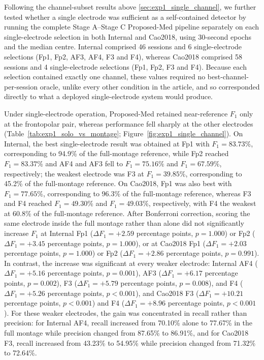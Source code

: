 Following the channel-subset results above \ref{sec:exp1_single_channel}, we further tested whether a single electrode was sufficient as a self-contained detector by running the complete Stage A--Stage C Proposed-Med pipeline separately on each single-electrode selection in both Internal and Cao2018, using 30-second epochs and the median centre. Internal comprised 46 sessions and 6 single-electrode selections (Fp1, Fp2, AF3, AF4, F3 and F4), whereas Cao2018 comprised 58 sessions and 4 single-electrode selections (Fp1, Fp2, F3 and F4). Because each selection contained exactly one channel, these values required no best-channel-per-session oracle, unlike every other condition in the article, and so corresponded directly to what a deployed single-electrode system would produce.

Under single-electrode operation, Proposed-Med retained near-reference $F_1$ only at the frontopolar pair, whereas performance fell sharply at the other electrodes (Table~\ref{tab:exp1_solo_vs_montage}; Figure~\ref{fig:exp1_single_channel}). On Internal, the best single-electrode result was obtained at Fp1 with $F_1=83.73\%$, corresponding to 94.9\% of the full-montage reference, while Fp2 reached $F_1=83.37\%$ and AF4 and AF3 fell to $F_1=75.16\%$ and $F_1=67.59\%$, respectively; the weakest electrode was F3 at $F_1=39.85\%$, corresponding to 45.2\% of the full-montage reference. On Cao2018, Fp1 was also best with $F_1=77.65\%$, corresponding to 96.3\% of the full-montage reference, whereas F3 and F4 reached $F_1=49.30\%$ and $F_1=49.03\%$, respectively, with F4 the weakest at 60.8\% of the full-montage reference. After Bonferroni correction, scoring the same electrode inside the full montage rather than alone did not significantly increase $F_1$ at Internal Fp1 ($\Delta F_1=+2.59$ percentage points, $p=1.000$) or Fp2 ($\Delta F_1=+3.45$ percentage points, $p=1.000$), or at Cao2018 Fp1 ($\Delta F_1=+2.03$ percentage points, $p=1.000$) or Fp2 ($\Delta F_1=+2.86$ percentage points, $p=0.991$). In contrast, the increase was significant at every weaker electrode: Internal AF4 ($\Delta F_1=+5.16$ percentage points, $p=0.001$), AF3 ($\Delta F_1=+6.17$ percentage points, $p=0.002$), F3 ($\Delta F_1=+5.79$ percentage points, $p=0.008$), and F4 ($\Delta F_1=+5.26$ percentage points, $p<0.001$), and Cao2018 F3 ($\Delta F_1=+10.21$ percentage points, $p<0.001$) and F4 ($\Delta F_1=+8.96$ percentage points, $p<0.001$). For these weaker electrodes, the gain was concentrated in recall rather than precision: for Internal AF4, recall increased from 70.10\% alone to 77.67\% in the full montage while precision changed from 87.65\% to 86.91\%, and for Cao2018 F3, recall increased from 43.23\% to 54.95\% while precision changed from 71.32\% to 72.64\%.

